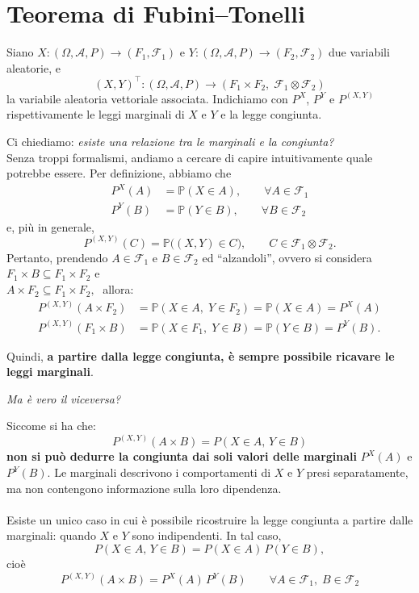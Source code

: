 \section{Teorema di Fubini--Tonelli}


Siano $X : (\Omega,\mathcal{A},P) \to (F_1,\mathcal{F}_1)$ e 
$Y : (\Omega,\mathcal{A},P) \to (F_2,\mathcal{F}_2)$ due variabili aleatorie, e
\[
(X,Y)^\top : (\Omega,\mathcal{A},P) \longrightarrow 
(F_1\times F_2,\;\mathcal{F}_1\otimes\mathcal{F}_2)
\]
la variabile aleatoria vettoriale associata. Indichiamo con
$P^X$, $P^Y$ e $P^{(X,Y)}$ rispettivamente le leggi marginali di $X$ e $Y$ 
e la legge congiunta.

\medskip
\noindent Ci chiediamo: \textit{esiste una relazione tra le marginali e la congiunta?}\\
Senza troppi formalismi, andiamo a cercare di capire intuitivamente quale potrebbe essere. Per definizione, abbiamo che
\begin{align*}
    P^X(A) &= \mathbb{P}(X\in A),\qquad \forall A\in \mathcal{F}_1\\
    P^Y(B) &= \mathbb{P}(Y\in B),\qquad \forall B\in \mathcal{F}_2
\end{align*}
\noindent e, più in generale,
\[
P^{(X,Y)}(C) = \mathbb{P}\big((X,Y)\in C\big),
\qquad 
C\in\mathcal{F}_1\otimes\mathcal{F}_2.
\]
Pertanto, prendendo $A\in\mathcal{F}_1$ e $B\in\mathcal{F}_2$ ed ``alzandoli'', ovvero si considera $F_1\times B\subseteq F_1\times F_2$ e \\
$A\times F_2\subseteq F_1\times F_2,\;$ allora:
\begin{align*}
    P^{(X,Y)}(A\times F_2) &= \mathbb{P}(X\in A, \;Y\in F_2) = \mathbb{P}(X\in A) = P^X(A)\\
    P^{(X,Y)}(F_1\times B) &= \mathbb{P}(X\in F_1, \;Y\in B) = \mathbb{P}(Y\in B) = P^Y(B).
\end{align*}

\noindent Quindi, \textbf{a partire dalla legge congiunta, è sempre possibile ricavare le leggi marginali}.

\bigskip
\noindent \textit{Ma è vero il viceversa?}

\medskip
\noindent Siccome si ha che:
\[
P^{(X,Y)}(A\times B) = P(X\in A,\,Y\in B)
\]
\textbf{non si può dedurre la congiunta dai soli valori delle marginali} $P^X(A)$ e $P^Y(B)$.  
Le marginali descrivono i comportamenti di $X$ e $Y$ presi separatamente, 
ma non contengono informazione sulla loro dipendenza.\\
\\
Esiste un unico caso in cui è possibile ricostruire la legge congiunta a partire dalle marginali: quando $X$ e $Y$ sono indipendenti.  
In tal caso,
\[
P(X\in A,\,Y\in B) = P(X\in A)\,P(Y\in B),
\]
cioè
\[
P^{(X,Y)}(A\times B) = P^X(A)\,P^Y(B)
\qquad\forall A\in\mathcal{F}_1,\;B\in\mathcal{F}_2
\]

